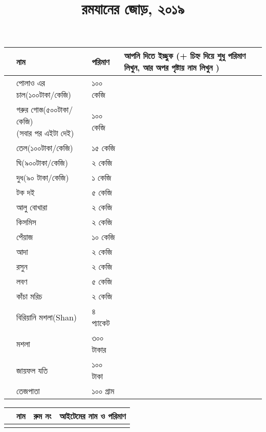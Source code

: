 \documentclass[12pt]{article}
\title{রমযানের জোড়, ২০১৯}
\date{}
\newcommand{\aline}{\\\hline \arabic{theyflines} &&&\rule{0cm}{0.8cm}}
\newcounter{magicrownumbers}
\newcommand\rownumber{\stepcounter{magicrownumbers}\arabic{magicrownumbers}}
\begin{document}
\maketitle
\begin{center}
\end{center}
\noindent
\bgroup
\def\arraystretch{2.6}
\begin{tabular}{@{}l|ll|p{15cm}}
\toprule
 &  নাম &  পরিমাণ & আপনি দিতে ইচ্ছুক (+ চিহ্ন দিয়ে শুধু পরিমাণ লিখুন, আর অপর পৃষ্টায় নাম লিখুন )\\
\toprule
\rownumber & পোলাও এর চাল(১০০টাকা/কেজি) & ১০০ কেজি &\\
\hline
\rownumber & \pbox{5cm}{গরুর গোস্ত(৫০০টাকা/কেজি)\\(সবার পর এইটা দেই)} & ১০০ কেজি &\\
\hline
\rownumber & তেল(১০০টাকা/কেজি) & ১৫ কেজি &\\
\hline
\rownumber & ঘি(৯০০টাকা/কেজি) & ২ কেজি &\\
\hline
\rownumber & দুধ(৯০ টাকা/কেজি) & ১ কেজি &\\
\hline
\rownumber & টক দই & ৫ কেজি & \\ 
\hline
\rownumber & আলু বোখারা & ২ কেজি &\\
\hline
\rownumber & কিসমিস & ২ কেজি &\\
\hline
\rownumber & পেঁয়াজ & ১০ কেজি &\\
\hline
\rownumber & আদা & ২ কেজি &\\
\hline
\rownumber & রসুন & ২ কেজি &\\
\hline
\rownumber & লবণ & ৫ কেজি &\\
\hline
\rownumber & কাঁচা মরিচ & ২ কেজি &\\
\hline
\rownumber & বিরিয়ানি মশলা(Shan) & ৪ প্যাকেট &\\
\hline
\rownumber & মশলা & ৩০০ টাকার & \\
\hline
\rownumber & জায়ফল যতি & ১০০ টাকা &\\
\hline
\rownumber & তেজপাতা & ১০০ গ্রাম & \\
\bottomrule
\end{tabular}
\egroup
\newpage
\noindent
\begin{tabular}{@{}p{0.25cm}|p{5.5cm}|p{1.5cm}|p{13cm}|}
\toprule
& নাম & রুম নং & আইটেমের নাম ও পরিমাণ
\forloop{theyflines}{1}{\value{theyflines} < 31}{\aline}\\
\toprule
\end{tabular}
\end{document}
